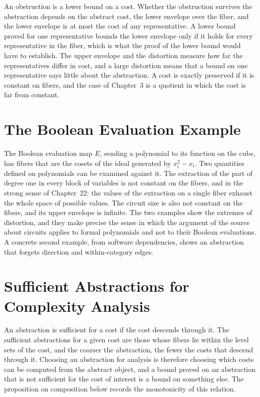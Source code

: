 \documentclass[11pt,letterpaper]{report}
\theoremstyle{plain}
\theoremstyle{definition}
\theoremstyle{remark}
\begin{document}
An obstruction is a lower bound on a cost. Whether the obstruction survives the abstraction depends on the abstract cost, the lower envelope over the fiber, and the lower envelope is at most the cost of any representative. A lower bound proved for one representative bounds the lower envelope only if it holds for every representative in the fiber, which is what the proof of the lower bound would have to establish. The upper envelope and the distortion measure how far the representatives differ in cost, and a large distortion means that a bound on one representative says little about the abstraction. A cost is exactly preserved if it is constant on fibers, and the case of Chapter~3 is a quotient in which the cost is far from constant.

\section{The Boolean Evaluation Example}

The Boolean evaluation map $E$, sending a polynomial to its function on the cube, has fibers that are the cosets of the ideal generated by $x_i^2-x_i$. Two quantities defined on polynomials can be examined against it. The extraction of the part of degree one in every block of variables is not constant on the fibers, and in the strong sense of Chapter~22: the values of the extraction on a single fiber exhaust the whole space of possible values. The circuit size is also not constant on the fibers, and its upper envelope is infinite. The two examples show the extremes of distortion, and they make precise the sense in which the argument of the source about circuits applies to formal polynomials and not to their Boolean evaluations. A concrete second example, from software dependencies, shows an abstraction that forgets direction and within-category edges.

\section{Sufficient Abstractions for Complexity Analysis}

An abstraction is sufficient for a cost if the cost descends through it. The sufficient abstractions for a given cost are those whose fibers lie within the level sets of the cost, and the coarser the abstraction, the fewer the costs that descend through it. Choosing an abstraction for analysis is therefore choosing which costs can be computed from the abstract object, and a bound proved on an abstraction that is not sufficient for the cost of interest is a bound on something else. The proposition on composition below records the monotonicity of this relation.
\end{document}
